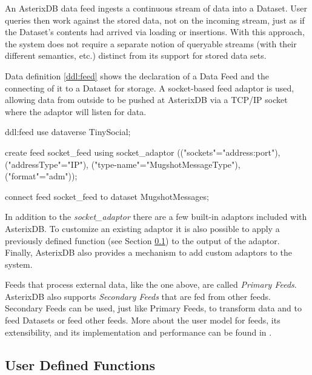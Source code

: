 An AsterixDB data feed ingests a continuous stream of data into a Dataset. 
User queries then work against the stored data, not on the incoming stream, just as if the Dataset's contents had arrived via loading or insertions. 
With this approach, the system does not require a separate notion of queryable streams (with their different semantics, etc.) distinct from its support for stored data sets.

Data definition \ref{ddl:feed} shows the declaration of a Data Feed and the connecting of it to a Dataset for storage. 
A socket-based feed adaptor is used, allowing data from outside to be pushed at AsterixDB via a TCP/IP socket where the adaptor will listen for data.

\begin{ddl}{ddl:feed}
use dataverse TinySocial;

create feed socket_feed
    using socket_adaptor 
        (("sockets"="{address}:{port}"),
         ("addressType"="IP"),
         ("type-name"="MugshotMessageType"),
         ("format"="adm"));

connect feed socket_feed to dataset MugshotMessages;
\end{ddl}

In addition to the \emph{socket\_adaptor} there are a few built-in adaptors included with AsterixDB.
To customize an existing adaptor it is also possible to apply a previously defined function (see Section \ref{ss:udfs}) to the output of the adaptor.
Finally, AsterixDB also provides a mechanism to add custom adaptors to the system.

Feeds that process external data, like the one above, are called \emph{Primary Feeds}. 
AsterixDB also supports \emph{Secondary Feeds} that are fed from other feeds.
Secondary Feeds can be used, just like Primary Feeds, to transform data and to feed Datasets or feed other feeds.
More about the user model for feeds, its extensibility, and its implementation and performance can be found in \cite{DBLP:conf/edbt/GroverC15}.

\subsection{User Defined Functions}\label{ss:udfs}


